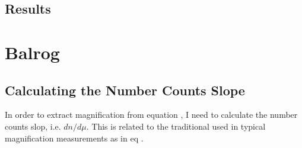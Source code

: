 \documentclass[12pt]{article}
\begin{document}
\subsection{Results}


\section{Balrog}

\subsection{Calculating the Number Counts Slope}
In order to extract magnification from equation {}, I need to
calculate the number counts slop, i.e. $dn/d\mu$. This is related to
the traditional \alpha used in typical magnification measurements as in eq {}. 




\end{document}

